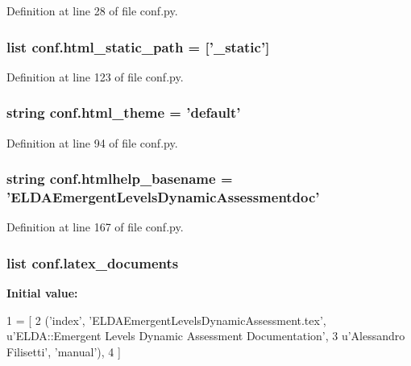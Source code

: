 Definition at line 28 of file conf.\+py.

\hypertarget{a00134_af4fb5d8851ccaade135c2668dd3ced41}{
\subsubsection[{html\+\_\+static\+\_\+path}]{\setlength{\rightskip}{0pt plus 5cm}list conf.\+html\+\_\+static\+\_\+path = \mbox{[}'\+\_\+static'\mbox{]}}}\label{a00134_af4fb5d8851ccaade135c2668dd3ced41}


Definition at line 123 of file conf.\+py.

\hypertarget{a00134_a6c3bfcc1a44546c1c75ce20f55bd0fd6}{
\subsubsection[{html\+\_\+theme}]{\setlength{\rightskip}{0pt plus 5cm}string conf.\+html\+\_\+theme = 'default'}}\label{a00134_a6c3bfcc1a44546c1c75ce20f55bd0fd6}


Definition at line 94 of file conf.\+py.

\hypertarget{a00134_aab7fddb2766ce3c430d8246fbfdbc7b1}{
\subsubsection[{htmlhelp\+\_\+basename}]{\setlength{\rightskip}{0pt plus 5cm}string conf.\+htmlhelp\+\_\+basename = 'E\+L\+D\+A\+Emergent\+Levels\+Dynamic\+Assessmentdoc'}}\label{a00134_aab7fddb2766ce3c430d8246fbfdbc7b1}


Definition at line 167 of file conf.\+py.

\hypertarget{a00134_a7812f49970f3de0d15dd7b9b9a10e3a1}{
\subsubsection[{latex\+\_\+documents}]{\setlength{\rightskip}{0pt plus 5cm}list conf.\+latex\+\_\+documents}}\label{a00134_a7812f49970f3de0d15dd7b9b9a10e3a1}
{\bfseries Initial value\+:}
\begin{DoxyCode}
1 = [
2   (\textcolor{stringliteral}{'index'}, \textcolor{stringliteral}{'ELDAEmergentLevelsDynamicAssessment.tex'}, \textcolor{stringliteral}{u'ELDA::Emergent Levels Dynamic Assessment
       Documentation'},
3    \textcolor{stringliteral}{u'Alessandro Filisetti'}, \textcolor{stringliteral}{'manual'}),
4 ]
\end{DoxyCode}


